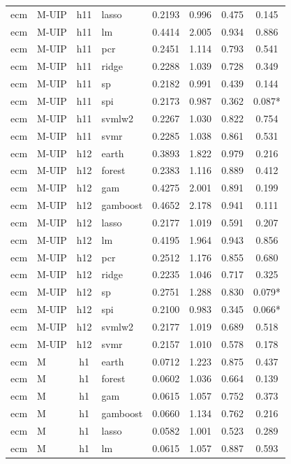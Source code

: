 \begin{ThreePartTable}
\begin{longtable}[t]{llclcccc}
ecm & M-UIP & h11 & lasso & 0.2193 & 0.996 & 0.475 & 0.145\\
ecm & M-UIP & h11 & lm & 0.4414 & 2.005 & 0.934 & 0.886\\
ecm & M-UIP & h11 & pcr & 0.2451 & 1.114 & 0.793 & 0.541\\
ecm & M-UIP & h11 & ridge & 0.2288 & 1.039 & 0.728 & 0.349\\
ecm & M-UIP & h11 & sp & 0.2182 & 0.991 & 0.439 & 0.144\\
ecm & M-UIP & h11 & spi & 0.2173 & 0.987 & 0.362 & 0.087*\\
ecm & M-UIP & h11 & svmlw2 & 0.2267 & 1.030 & 0.822 & 0.754\\
ecm & M-UIP & h11 & svmr & 0.2285 & 1.038 & 0.861 & 0.531\\
\addlinespace
ecm & M-UIP & h12 & earth & 0.3893 & 1.822 & 0.979 & 0.216\\
ecm & M-UIP & h12 & forest & 0.2383 & 1.116 & 0.889 & 0.412\\
ecm & M-UIP & h12 & gam & 0.4275 & 2.001 & 0.891 & 0.199\\
ecm & M-UIP & h12 & gamboost & 0.4652 & 2.178 & 0.941 & 0.111\\
ecm & M-UIP & h12 & lasso & 0.2177 & 1.019 & 0.591 & 0.207\\
ecm & M-UIP & h12 & lm & 0.4195 & 1.964 & 0.943 & 0.856\\
ecm & M-UIP & h12 & pcr & 0.2512 & 1.176 & 0.855 & 0.680\\
ecm & M-UIP & h12 & ridge & 0.2235 & 1.046 & 0.717 & 0.325\\
ecm & M-UIP & h12 & sp & 0.2751 & 1.288 & 0.830 & 0.079*\\
ecm & M-UIP & h12 & spi & 0.2100 & 0.983 & 0.345 & 0.066*\\
ecm & M-UIP & h12 & svmlw2 & 0.2177 & 1.019 & 0.689 & 0.518\\
ecm & M-UIP & h12 & svmr & 0.2157 & 1.010 & 0.578 & 0.178\\
\addlinespace
ecm & M & h1 & earth & 0.0712 & 1.223 & 0.875 & 0.437\\
ecm & M & h1 & forest & 0.0602 & 1.036 & 0.664 & 0.139\\
ecm & M & h1 & gam & 0.0615 & 1.057 & 0.752 & 0.373\\
ecm & M & h1 & gamboost & 0.0660 & 1.134 & 0.762 & 0.216\\
ecm & M & h1 & lasso & 0.0582 & 1.001 & 0.523 & 0.289\\
ecm & M & h1 & lm & 0.0615 & 1.057 & 0.887 & 0.593\\

\end{longtable}
\end{ThreePartTable}
